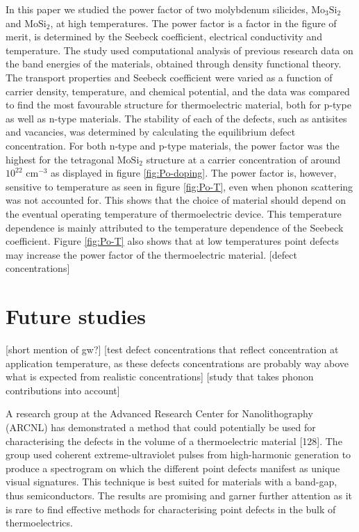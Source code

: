 \documentclass[12pt]{article}
\theoremstyle{plain}
\theoremstyle{definition}
\newcommand{\<}{\langle}
\renewcommand{\>}{\rangle}
\begin{document}
In this paper we studied the power factor of two molybdenum silicides, $\text{Mo}_3\text{Si}_2$ and $\text{MoSi}_2$, at high temperatures. The power factor is a factor in the figure of merit, is determined by the Seebeck coefficient, electrical conductivity and temperature. The study used computational analysis of previous research data on the band energies of the materials, obtained through density functional theory. The transport properties and Seebeck coefficient were varied as a function of carrier density, temperature, and chemical potential, and the data was compared to find the most favourable structure for thermoelectric material, both for p-type as well as n-type materials. The stability of each of the defects, such as antisites and vacancies, was determined by calculating the equilibrium defect concentration.  
For both n-type and p-type materials, the power factor was the highest for the tetragonal $\text{MoSi}_{2}$ structure at a carrier concentration of around $10^22$ $\text{cm}^{-3}$ as displayed in figure \ref{fig:Po-doping}. The power factor is, however, sensitive to temperature as seen in figure \ref{fig:Po-T}, even when phonon scattering was not accounted for. This shows that the choice of material should depend on the eventual operating temperature of thermoelectric device. This temperature dependence is mainly attributed to the temperature dependence of the Seebeck coefficient. Figure \ref{fig:Po-T} also shows that at low temperatures point defects may increase the power factor of the thermoelectric material. 
[defect concentrations]



\section{Future studies}

[short mention of gw?]
[test defect concentrations that reflect concentration at application temperature, as these defects concentrations are probably way above what is expected from realistic concentrations]
[study that takes phonon contributions into account]

A research group at the Advanced Research Center for Nanolithography (ARCNL) has demonstrated a method that could potentially be used for characterising the defects in the volume of a thermoelectric material [128]. The group used coherent extreme-ultraviolet pulses from high-harmonic generation to produce a spectrogram on which the different point defects manifest as unique visual signatures. This technique is best suited for materials with a band-gap, thus semiconductors. The results are promising and garner further attention as it is rare to find effective methods for characterising point defects in the bulk of thermoelectrics.
\end{document}
